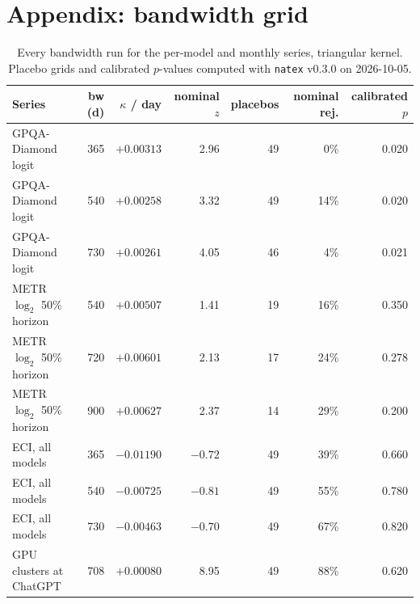 \documentclass[11pt]{article}
\newcommand{\natex}{\texttt{natex}}
\begin{document}
\section*{Appendix: bandwidth grid}

\begin{table}[h]
\centering
\small
\begin{tabular}{@{}lrrrrrr@{}}
\toprule
Series & bw (d) & $\kappa$ / day & nominal $z$ & placebos & nominal rej. & calibrated $p$ \\
\midrule
GPQA-Diamond logit & 365 & $+0.00313$ & 2.96 & 49 & 0\% & 0.020 \\
GPQA-Diamond logit & 540 & $+0.00258$ & 3.32 & 49 & 14\% & 0.020 \\
GPQA-Diamond logit & 730 & $+0.00261$ & 4.05 & 46 & 4\% & 0.021 \\
METR $\log_2$ 50\% horizon & 540 & $+0.00507$ & 1.41 & 19 & 16\% & 0.350 \\
METR $\log_2$ 50\% horizon & 720 & $+0.00601$ & 2.13 & 17 & 24\% & 0.278 \\
METR $\log_2$ 50\% horizon & 900 & $+0.00627$ & 2.37 & 14 & 29\% & 0.200 \\
ECI, all models & 365 & $-0.01190$ & $-0.72$ & 49 & 39\% & 0.660 \\
ECI, all models & 540 & $-0.00725$ & $-0.81$ & 49 & 55\% & 0.780 \\
ECI, all models & 730 & $-0.00463$ & $-0.70$ & 49 & 67\% & 0.820 \\
GPU clusters at ChatGPT & 708 & $+0.00080$ & 8.95 & 49 & 88\% & 0.620 \\
\bottomrule
\end{tabular}
\caption{Every bandwidth run for the per-model and monthly series, triangular kernel.
Placebo grids and calibrated $p$-values computed with \natex{} v0.3.0 on 2026-10-05.}
\label{tab:bw}
\end{table}
\end{document}

